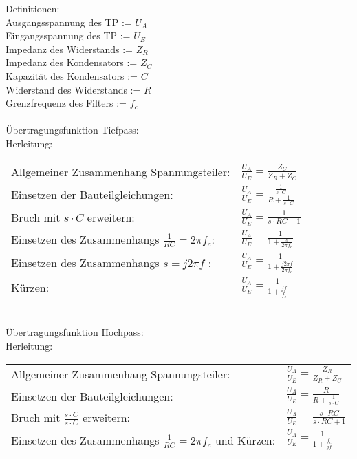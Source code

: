 \documentclass[A4]{scrartcl}
\begin{document}
  \newpage
  Definitionen:\\
  Ausgangsspannung des TP := $U_A$\\
  Eingangsspannung des TP := $U_E$\\
  Impedanz des Widerstands := $Z_R$\\
  Impedanz des Kondensators := $Z_C$\\
  Kapazität des Kondensators := $C$\\
  Widerstand des Widerstands := $R$\\
  Grenzfrequenz des Filters := $f_c$\\
  \\
  Übertragungsfunktion Tiefpass:\\
  Herleitung:\\ 
  \begin{tabular}{l|l}
    Allgemeiner Zusammenhang Spannungsteiler:& $\frac{U_A}{U_E} = \frac{Z_C}{Z_R+Z_C}$\\
    Einsetzen der Bauteilgleichungen:& $\frac{U_A}{U_E} = \frac{\frac{1}{s\cdot C}}{R + \frac{1}{s \cdot C}}$\\
    Bruch mit $s\cdot C$ erweitern:& $\frac{U_A}{U_E} = \frac{1}{s \cdot RC + 1}$\\
    Einsetzen des Zusammenhangs $\frac{1}{RC} = 2\pi f_c$:& $\frac{U_A}{U_E} = \frac{1}{1 + \frac{s}{2\pi f_c}}$\\
    Einsetzen des Zusammenhangs $s = j2\pi f$ :& $\frac{U_A}{U_E} = \frac{1}{1 + \frac{j2\pi f}{2\pi f_c}}$\\
    Kürzen:& $\frac{U_A}{U_E} = \frac{1}{1 + \frac{jf}{f_c}}$\\
  \end{tabular}\\
  Übertragungsfunktion Hochpass:\\
  Herleitung:\\ 
  \begin{tabular}{l|l}
    Allgemeiner Zusammenhang Spannungsteiler:& $\frac{U_A}{U_E} = \frac{Z_R}{Z_R+Z_C}$\\
    Einsetzen der Bauteilgleichungen:& $\frac{U_A}{U_E} = \frac{R}{R+\frac{1}{s \cdot C}}$\\
    Bruch mit $\frac{s\cdot C}{s\cdot C}$ erweitern:& $\frac{U_A}{U_E} = \frac{s \cdot RC}{s \cdot RC+1}$\\
    Einsetzen des Zusammenhangs $\frac{1}{RC} = 2\pi f_c$ und Kürzen:& $\frac{U_A}{U_E} = \frac{1}{1+\frac{f_c}{jf}}$\\
  \end{tabular} 
\end{document}
